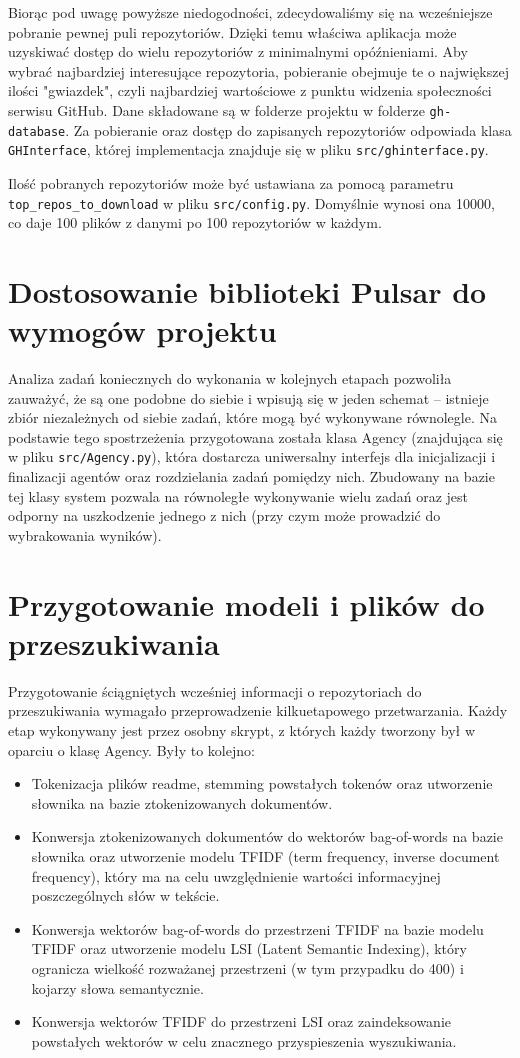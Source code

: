 \documentclass[12pt, oneside, final]{report}
\begin{document}
Biorąc pod uwagę powyższe niedogodności, zdecydowaliśmy się na wcześniejsze pobranie pewnej puli repozytoriów. Dzięki temu właściwa aplikacja może uzyskiwać dostęp do wielu repozytoriów z minimalnymi opóźnieniami. Aby wybrać najbardziej interesujące repozytoria, pobieranie obejmuje te o największej ilości "gwiazdek", czyli najbardziej wartościowe z punktu widzenia społeczności serwisu GitHub. Dane składowane są w folderze projektu w folderze \texttt{gh-database}. Za pobieranie oraz dostęp do zapisanych repozytoriów odpowiada klasa \texttt{GHInterface}, której implementacja znajduje się w pliku \texttt{src/ghinterface.py}.

Ilość pobranych repozytoriów może być ustawiana za pomocą parametru \texttt{top\_repos\_to\_down\-load} w pliku \texttt{src/config.py}. Domyślnie wynosi ona 10000, co daje 100 plików z danymi po 100 repozytoriów w każdym.

\section*{Dostosowanie biblioteki Pulsar do wymogów projektu}
Analiza zadań koniecznych do wykonania w kolejnych etapach pozwoliła zauważyć, że są one podobne do siebie i wpisują się w jeden schemat -- istnieje zbiór niezależnych od siebie zadań, które mogą być wykonywane równolegle. Na podstawie tego spostrzeżenia przygotowana została klasa Agency (znajdująca się w pliku \texttt{src/Agency.py}), która dostarcza uniwersalny interfejs dla inicjalizacji i finalizacji agentów oraz rozdzielania zadań pomiędzy nich. Zbudowany na bazie tej klasy system pozwala na równoległe wykonywanie wielu zadań oraz jest odporny na uszkodzenie jednego z nich (przy czym może prowadzić do wybrakowania wyników). 

\section*{Przygotowanie modeli i plików do przeszukiwania}
Przygotowanie ściągniętych wcześniej informacji o repozytoriach do przeszukiwania wymagało przeprowadzenie kilkuetapowego przetwarzania. Każdy etap wykonywany jest przez osobny skrypt, z których każdy tworzony był w oparciu o klasę Agency. Były to kolejno:
\begin{itemize}
	\item{Tokenizacja plików readme, stemming powstałych tokenów oraz utworzenie słownika na bazie ztokenizowanych dokumentów.}
	\item{Konwersja ztokenizowanych dokumentów do wektorów bag-of-words na bazie słownika oraz utworzenie modelu TFIDF (term frequency, inverse document frequency), który ma na celu uwzględnienie wartości informacyjnej poszczególnych słów w tekście.}
	\item{Konwersja wektorów bag-of-words do przestrzeni TFIDF na bazie modelu TFIDF oraz utworzenie modelu LSI (Latent Semantic Indexing), który ogranicza wielkość rozważanej przestrzeni (w tym przypadku do 400) i kojarzy słowa semantycznie.}
	\item{Konwersja wektorów TFIDF do przestrzeni LSI oraz zaindeksowanie powstałych wektorów w celu znacznego przyspieszenia wyszukiwania.}
\end{itemize}
\end{document}
